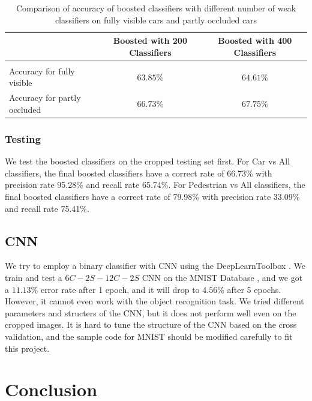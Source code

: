 \documentclass{article} %
\begin{document}
\begin{table}[htb]
	\caption{Comparison of accuracy of boosted classifiers with different number of weak classifiers on fully visible cars and partly occluded cars}
	\label{tab:reg1}
	\begin{center}
		\begin{tabular}{lcc}
			\multicolumn{1}{c}{} &\multicolumn{1}{c}{Boosted with 200 Classifiers}  &\multicolumn{1}{c}{Boosted with 400 Classifiers}
			\\ \hline \\
			Accuracy for fully visible & $63.85
\%$ & $64.61\%$ \\
			Accuracy for partly occluded    & $66.73
\%$ & $67.75\%$ \\
		\end{tabular}
	\end{center}
\end{table}

\subsubsection{Testing}

We test the boosted classifiers on the cropped testing set first. For Car vs All classifiers, the final boosted classifiers have a correct rate of 66.73\% with precision rate 95.28\% and recall rate 65.74\%. For Pedestrian vs All classifiers, the final boosted classifiers have a correct rate of 79.98\% with precision rate 33.09\% and recall rate 75.41\%.


\subsection{CNN}

We try to employ a binary classifier with CNN using the DeepLearnToolbox \cite{palm2012prediction}. We train and test a $6C-2S-12C-2S$ CNN on the MNIST Database \cite{lecun1998gradient}, and we got a $11.13\%$ error rate after 1 epoch, and it will drop to $4.56\%$ after 5 epochs. However, it cannot even work with the object recognition task. We tried different parameters and structers of the CNN, but it does not perform well even on the cropped images. It is hard to tune the structure of the CNN based on the cross validation, and the sample code for MNIST should be modified carefully to fit this project.

\section{Conclusion}
\end{document}
